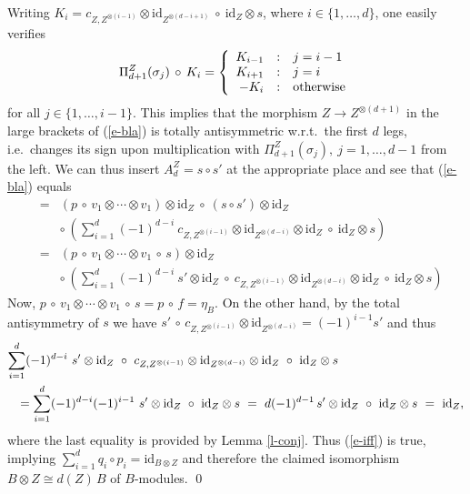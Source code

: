 \documentclass[11pt]{article}
\theoremstyle{definition}
\theoremstyle{definition}
\theoremstyle{remark}
\newcommand{\mcirc}{\,\circ\,}
\newcommand{\rarr}{\rightarrow}
\def\id{\mathrm{id}}
\begin{document}
Writing $K_i=c_{Z,Z^{\otimes(i-1)}}\otimes\id_{Z^{\otimes(d-i+1)}}\ \circ\ \id_Z\otimes s$, where
$i\in\{1,\ldots,d\}$, one easily verifies
\[ \Pi^Z_{d+1}(\sigma_j)\mcirc K_i= \left\{ 
\begin{array} {r@{\quad:\quad}l}
  K_{i-1} & j=i-1 \\ K_{i+1} & j=i \\ -K_i & \mbox{otherwise}
\end{array}\right. \]
for all $j\in\{1,\ldots,i-1\}$. This implies that the morphism $Z\rarr Z^{\otimes (d+1)}$ in the
large brackets of (\ref{e-bla}) is totally antisymmetric w.r.t.\ the first $d$ legs, i.e.\ changes
its sign upon multiplication with $\Pi_{d+1}^Z(\sigma_j),\ j=1,\ldots,d-1$ from the left. 
We can thus insert $A_d^Z=s\circ s'$ at the appropriate place and see that (\ref{e-bla}) equals
\begin{eqnarray*} &=& (p \mcirc v_1\otimes \cdots\otimes v_1) \otimes\id_Z \ \circ\ 
  (s\circ s')\otimes\id_Z \\
&& \circ\ \left(\sum_{i=1}^d (-1)^{d-i}\ c_{Z,Z^{\otimes(i-1)}}\otimes
     \id_{Z^{\otimes(d-i)}} \otimes\id_Z\ \circ\ \id_Z\otimes s \right) \\
 &=& (p\mcirc v_1\otimes \cdots\otimes v_1\mcirc
 s)\otimes\id_Z \\
&& \circ\ \left(\sum_{i=1}^d (-1)^{d-i}\
   s'\otimes\id_Z\ \circ\ c_{Z,Z^{\otimes(i-1)}}\otimes\id_{Z^{\otimes(d-i)}} \otimes\id_Z\ \circ\
  \id_Z\otimes s \right) 
\end{eqnarray*}
Now, $p\mcirc v_1\otimes \cdots\otimes v_1\mcirc s=p\mcirc f=\eta_B$.
On the other hand, by the total antisymmetry of $s$ we have 
$s'\mcirc c_{Z,Z^{\otimes(i-1)}}\otimes\id_{Z^{\otimes(d-i)}}=(-1)^{i-1}s'$ and thus
\begin{eqnarray*} \lefteqn{ \sum_{i=1}^d (-1)^{d-i}\ s'\otimes\id_Z\ \circ\
   c_{Z,Z^{\otimes(i-1)}}\otimes\id_{Z^{\otimes(d-i)}} \otimes\id_Z\ \circ\ \id_Z\otimes s } \\
   && = \sum_{i=1}^d (-1)^{d-i}(-1)^{i-1}\ s'\otimes\id_Z\ \circ\ \id_Z\otimes s
   \ =\ d(-1)^{d-1}\,s'\otimes\id_Z\ \circ\ \id_Z\otimes s\ =\ \id_Z, 
\end{eqnarray*}
where the last equality is provided by Lemma \ref{l-conj}. Thus (\ref{e-iff}) is true, implying
$\sum_{i=1}^d q_i\circ p_i=\id_{B\otimes Z}$ and therefore the claimed isomorphism
$B\otimes Z\cong d(Z)\,B$ of $B$-modules.
\qed
\end{document}
